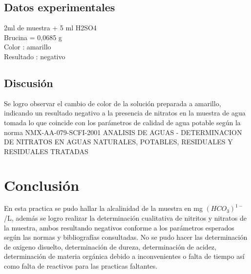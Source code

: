 \documentclass[a4paper,12pt]{article} %
\begin{document}
\subsection{Datos experimentales} 
2ml de muestra + 5 ml H2SO4 \\
Brucina = 0,0685 g  \\
Color : amarillo \\
Resultado : negativo \\

\subsection{Discusión} 
Se logro observar el cambio de color de la solución preparada a amarillo, indicando un resultado negativo a la presencia de nitratos en la muestra de agua tomada lo que coincide con los parámetros de calidad de agua potable según la norma     NMX-AA-079-SCFI-2001 ANALISIS DE AGUAS - DETERMINACION DE NITRATOS EN AGUAS NATURALES, POTABLES, RESIDUALES Y RESIDUALES TRATADAS



\newpage

\section{Conclusión}
En esta practica se pudo hallar la alcalinidad de la muestra en mg $(HCO_3)^{1-}$/L, además se logro realizar la determinación cualitativa de nitritos y nitratos de la muestra, ambos resultando negativos conforme a los parámetros esperados según las normas y bibliografías consultadas. No se pudo hacer las determinación de oxigeno disuelto, determinación de dureza, determinación de acidez, determinación de materia orgánica debido a inconvenientes o falta de tiempo así como falta de reactivos para las practicas faltantes.



\newpage
\end{document}
